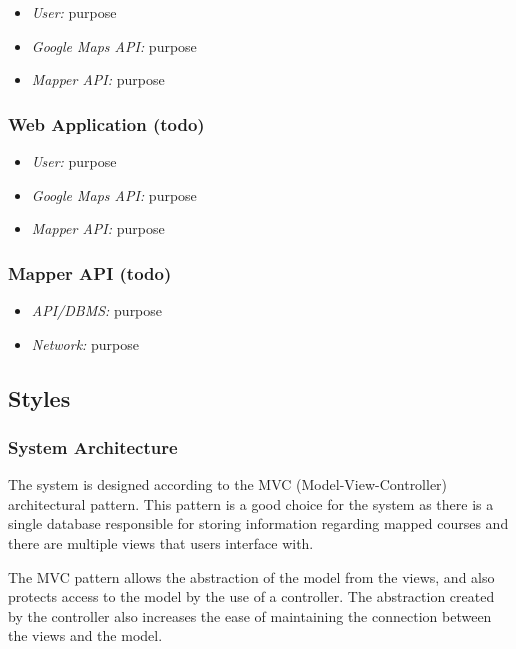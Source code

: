\documentclass{article}
\begin{document}
    \begin{itemize}
        \item \textit{User:} purpose
        \item \textit{Google Maps API:} purpose
        \item \textit{Mapper API:} purpose
    \end{itemize}

    \subsubsection{Web Application (todo)}

    \begin{itemize}
        \item \textit{User:} purpose
        \item \textit{Google Maps API:} purpose
        \item \textit{Mapper API:} purpose
    \end{itemize}

    \subsubsection{Mapper API (todo)}

    \begin{itemize}
        \item \textit{API/DBMS:} purpose
        \item \textit{Network:} purpose
    \end{itemize}

    \subsection{Styles}

    \subsubsection{System Architecture}
    
    The system is designed according to the MVC (Model-View-Controller)
    architectural pattern. This pattern is a good choice for the system as
    there is a single database responsible for storing information regarding
    mapped courses and there are multiple views that users interface with.
    
    The MVC pattern allows the abstraction of the model from the views, and
    also protects access to the model by the use of a controller. The
    abstraction created by the controller also increases the ease of
    maintaining the connection between the views and the model.
\end{document}
